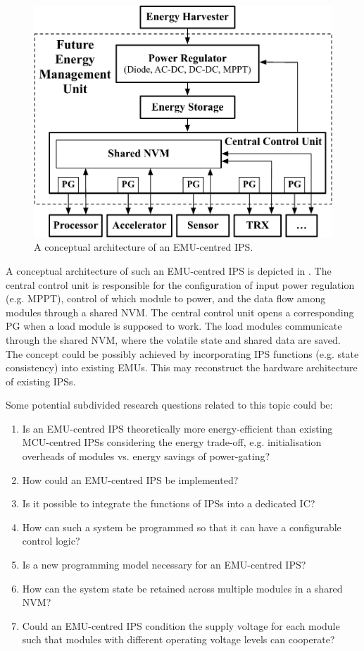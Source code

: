 \begin{figure}
    \centering
    \includegraphics[width=0.9\columnwidth]{ch6_conclusion/figures/EMUIPSarch.pdf}
    \caption{A conceptual architecture of an EMU-centred IPS.}
    \label{fig:emuips}
\end{figure}

A conceptual architecture of such an EMU-centred IPS is depicted in .
The central control unit is responsible for the configuration of input power regulation (e.g. MPPT), control of which module to power, and the data flow among modules through a shared NVM. 
The central control unit opens a corresponding PG when a load module is supposed to work.
The load modules communicate through the shared NVM, where the volatile state and shared data are saved. 
The concept could be possibly achieved by incorporating IPS functions (e.g. state consistency) into existing EMUs.
This may reconstruct the hardware architecture of existing IPSs.

Some potential subdivided research questions related to this topic could be:
\begin{enumerate}
    \item Is an EMU-centred IPS theoretically more energy-efficient than existing MCU-centred IPSs considering the energy trade-off, e.g. initialisation overheads of modules vs. energy savings of power-gating?
    \item How could an EMU-centred IPS be implemented?
    \item Is it possible to integrate the functions of IPSs into a dedicated IC?
    \item How can such a system be programmed so that it can have a configurable control logic?
    \item Is a new programming model necessary for an EMU-centred IPS?
    \item How can the system state be retained across multiple modules in a shared NVM?
    \item Could an EMU-centred IPS condition the supply voltage for each module such that modules with different operating voltage levels can cooperate? 
\end{enumerate}

